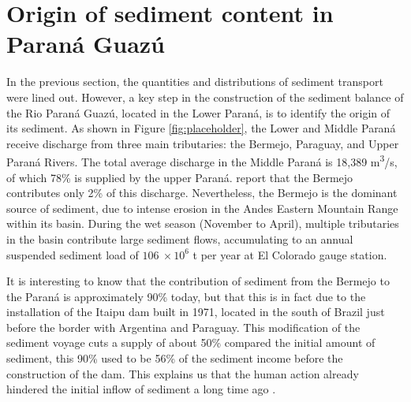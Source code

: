 \section{Origin of sediment content in Paraná Guazú}
\label{sec:origin sediment content}
In the previous section, the quantities and distributions of sediment transport were lined out. However, a key step in the construction of the sediment balance of the Rio Paraná Guazú, located in the Lower Paraná, is to identify the origin of its sediment. As shown in Figure \ref{fig:placeholder}, the Lower and Middle Paraná receive discharge from three main tributaries: the Bermejo, Paraguay, and Upper Paraná Rivers. The total average discharge in the Middle Paraná is 18,389 m\textsuperscript{3}/s, of which 78\% is supplied by the upper Paraná. \citeauthor{lopezweibelSourcesTemporalDynamics2022} report that the Bermejo contributes only 2\% of this discharge. Nevertheless, the Bermejo is the dominant source of sediment, due to intense erosion in the Andes Eastern Mountain Range within its basin. During the wet season (November to April), multiple tributaries in the basin contribute large sediment flows, accumulating to an annual suspended sediment load of $106 ~\times 10^6$ t per year at El Colorado gauge station. 

It is interesting to know that the contribution of sediment from the Bermejo to the Paraná is approximately 90\% today, but that this is in fact due to the installation of the Itaipu dam built in 1971, located in the south of Brazil just before the border with Argentina and Paraguay. This modification of the sediment voyage cuts a supply of about 50\% compared the initial amount of sediment, this 90\% used to be 56\% of the sediment income before the construction of the dam. This explains us that the human action already hindered the initial inflow of sediment a long time ago \autocite{hibaParanaRiverEcological2024}.

